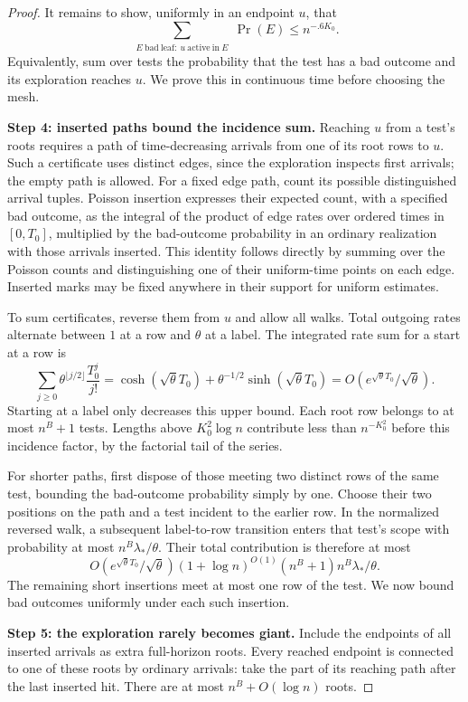 \begin{proof}
It remains to show, uniformly in an endpoint \(u\), that
\[
 \sum_{\substack{E\ \mathrm{bad\ leaf}:\ u\ \mathrm{active\ in}\ E}}
       \Pr(E)\le n^{-.6K_0}.
\]
Equivalently, sum over tests the probability that the test has a bad
outcome and its exploration reaches \(u\). We prove this in continuous
time before choosing the mesh.

\noindent\textbf{Step 4: inserted paths bound the incidence sum.}\quad
Reaching \(u\) from a test's roots requires a path of time-decreasing
arrivals from one of its root rows to \(u\). Such a certificate uses
distinct edges, since the exploration inspects first arrivals; the empty
path is allowed. For a fixed edge path, count its possible distinguished
arrival tuples. Poisson insertion expresses their expected count,
with a specified bad outcome, as the integral of the product of edge
rates over ordered times in \([0,T_0]\), multiplied by the bad-outcome
probability in an ordinary realization with those arrivals inserted.
This identity follows directly by summing over the Poisson counts and
distinguishing one of their uniform-time points on each edge. Inserted
marks may be fixed anywhere in their support for uniform estimates.

To sum certificates, reverse them from \(u\) and allow all walks. Total
outgoing rates alternate between \(1\) at a row and \(\theta\) at a
label. The integrated rate sum for a start at a row is
\[
 \sum_{j\ge0}\theta^{\lfloor j/2\rfloor}\frac{T_0^j}{j!}
 =\cosh(\sqrt\theta T_0)+\theta^{-1/2}\sinh(\sqrt\theta T_0)
 =O(e^{\sqrt\theta T_0}/\sqrt\theta).
\]
Starting at a label only decreases this upper bound. Each root row
belongs to at most \(n^B+1\) tests. Lengths above
\(K_0^2\log n\) contribute less than \(n^{-K_0^2}\) before this
incidence factor, by the factorial tail of the series.

For shorter paths, first dispose of those meeting two distinct rows of
the same test, bounding the bad-outcome probability simply by one. Choose
their two positions on the path and a test incident to the earlier row.
In the normalized reversed walk, a subsequent label-to-row transition
enters that test's scope with probability at most
\(n^B\lambda_*/\theta\). Their total contribution is therefore at most
\[
 O(e^{\sqrt\theta T_0}/\sqrt\theta)(1+\log n)^{O(1)}
       (n^B+1)n^B\lambda_*/\theta.
\]
The remaining short insertions meet at most one row of the test. We now
bound bad outcomes uniformly under each such insertion.

\noindent\textbf{Step 5: the exploration rarely becomes giant.}\quad
Include the endpoints of all inserted arrivals as extra full-horizon
roots. Every reached endpoint is connected to one of these roots by
ordinary arrivals: take the part of its reaching path after the last
inserted hit. There are at most \(n^B+O(\log n)\) roots.


\end{proof}
